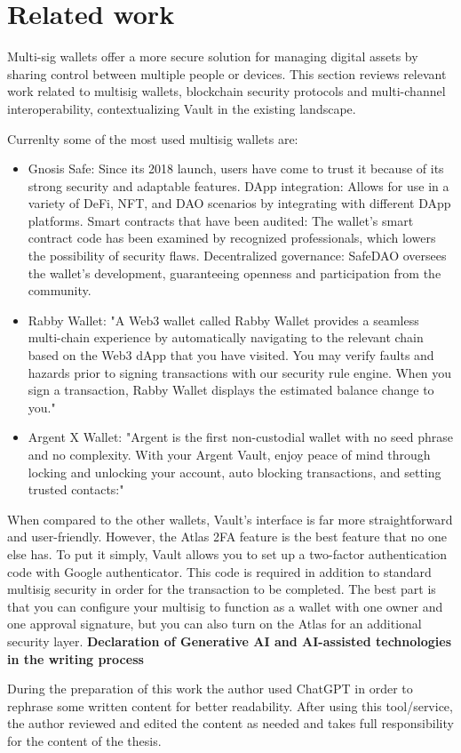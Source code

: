 \section{Related work}
\label{sec:ch1sec3}

\par Multi-sig wallets offer a more secure solution for managing digital assets by sharing control between multiple people or devices. This section reviews relevant work related to multisig wallets, blockchain security protocols and multi-channel interoperability, contextualizing Vault in the existing landscape.
\par Currenlty some of the most used multisig wallets are:
\begin{itemize}
	\item Gnosis Safe: Since its 2018 launch, users have come to trust it because of its strong security and adaptable features. DApp integration: Allows for use in a variety of DeFi, NFT, and DAO scenarios by integrating with different DApp platforms. Smart contracts that have been audited: The wallet's smart contract code has been examined by recognized professionals, which lowers the possibility of security flaws. Decentralized governance: SafeDAO oversees the wallet's development, guaranteeing openness and participation from the community.
	\item Rabby Wallet: "A Web3 wallet called Rabby Wallet provides a seamless multi-chain experience by automatically navigating to the relevant chain based on the Web3 dApp that you have visited. You may verify faults and hazards prior to signing transactions with our security rule engine. When you sign a transaction, Rabby Wallet displays the estimated balance change to you."\cite{rabbywallet}
	\item Argent X Wallet: "Argent is the first non-custodial wallet with no seed phrase and no complexity. With your Argent Vault, enjoy peace of mind through locking and unlocking your account, auto blocking transactions, and setting trusted contacts:"\cite{argent}
\end{itemize}

\par When compared to the other wallets, Vault's interface is far more straightforward and user-friendly. However, the Atlas 2FA feature is the best feature that no one else has. To put it simply, Vault allows you to set up a two-factor authentication code with Google authenticator. This code is required in addition to standard multisig security in order for the transaction to be completed. The best part is that you can configure your multisig to function as a wallet with one owner and one approval signature, but you can also turn on the Atlas for an additional security layer.
\newline
\newline
\newline
\textbf{Declaration of Generative AI and AI-assisted technologies in the writing process}
\par During the preparation of this work the author used ChatGPT in order to rephrase some written content for better readability. After using this tool/service, the author reviewed and edited the content as needed and takes full responsibility for the content of the thesis.